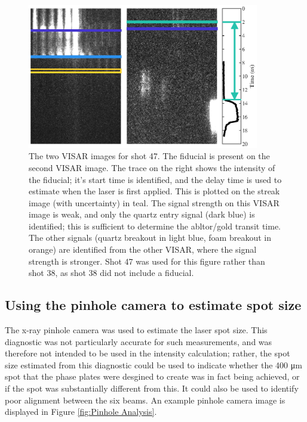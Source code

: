 \begin{figure} [h]
\begin{centering}
\includegraphics[width=0.9\textwidth]{figures/Experiment/FiduPlot.eps}%
\caption{\label{fig:Fidu} The two VISAR images for shot 47. The fiducial is present on the second VISAR image. The trace on the right shows the intensity of the fiducial; it's start time is identified, and the delay time is used to estimate when the laser is first applied. This is plotted on the streak image (with uncertainty) in teal. The signal strength on this VISAR image is weak, and only the quartz entry signal (dark blue) is identified; this is sufficient to determine the abltor/gold transit time. The other signals (quartz breakout in light blue, foam breakout in orange) are identified from the other VISAR, where the signal strength is stronger. Shot 47 was used for this figure rather than shot 38, as shot 38 did not include a fiducial.}
\end{centering}
\end{figure}



\subsection{Using the pinhole camera to estimate spot size} \label{Estimating spot size}

The x-ray pinhole camera was used to estimate the laser spot size. This diagnostic was not particularly accurate for such measurements, and was therefore not intended to be used in the intensity calculation; rather, the spot size estimated from this diagnostic could be used to indicate whether the 400 \unit{\micro\meter} spot that the phase plates were desgined to create was in fact being achieved, or if the spot was substantially different from this. It could also be used to identify poor alignment between the six beams. An example pinhole camera image is displayed in Figure \ref{fig:Pinhole Analysis}.

